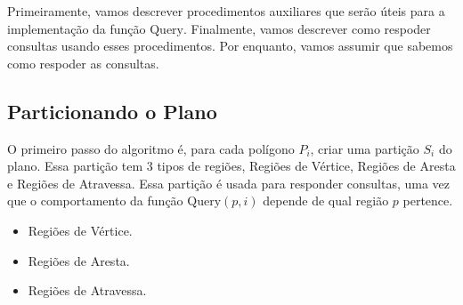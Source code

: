 \documentclass{article}
\begin{document}
Primeiramente, vamos descrever procedimentos auxiliares que serão úteis para a implementação da função \(\text{Query}\). Finalmente, vamos descrever como respoder consultas usando esses procedimentos. Por enquanto, vamos assumir que sabemos como respoder as consultas.

\subsection{Particionando o Plano}

O primeiro passo do algoritmo é, para cada polígono \(P_i\), criar uma partição \(S_i\) do plano. Essa partição tem 3 tipos de regiões, Regiões de Vértice, Regiões de Aresta e Regiões de Atravessa. Essa partição é usada para responder consultas, uma vez que o comportamento da função \(\text{Query}(p, i)\) depende de qual região \(p\) pertence.

\begin{itemize}[noitemsep]
	\item Regiões de Vértice.
	\item Regiões de Aresta.
	\item Regiões de Atravessa.
\end{itemize}


\end{document}
